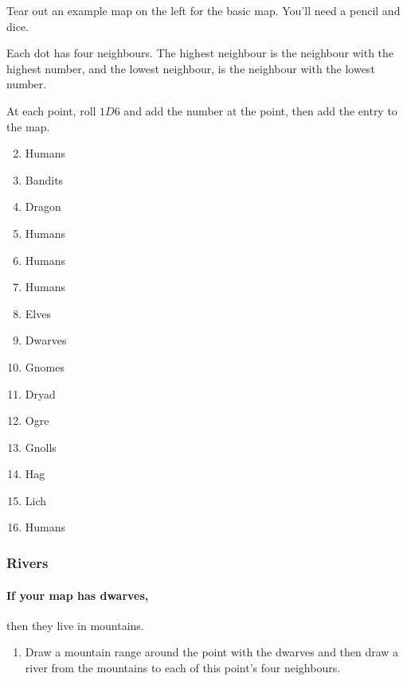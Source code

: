 \begin{multicols}{2}


Tear out an example map on the left for the basic map.
You'll need a pencil and dice.

Each dot has four neighbours.
The highest neighbour is the neighbour with the highest number, and the lowest neighbour, is the neighbour with the lowest number.

At each point, roll $1D6$ and add the number at the point, then add the entry to the map.

\begin{multicols}{2}

\begin{enumerate}
  \setcounter{enumi}{1}
  \item
  Humans
  \item
  Bandits
  \item
  Dragon
  \item
  Humans
  \item
  Humans
  \item
  Humans
  \item
  Elves
  \item
  Dwarves
  \item
  Gnomes
  \item
  Dryad
  \item
  Ogre
  \item
  Gnolls
  \item
  Hag
  \item
  Lich
  \item
  Humans
\end{enumerate}

\end{multicols}

\subsubsection{Rivers}

\paragraph{If your map has dwarves,}
then they live in mountains.

\begin{enumerate}
  \item
  Draw a mountain range around the point with the dwarves and then draw a river from the mountains to each of this point's four neighbours.


\end{enumerate}
\end{multicols}
